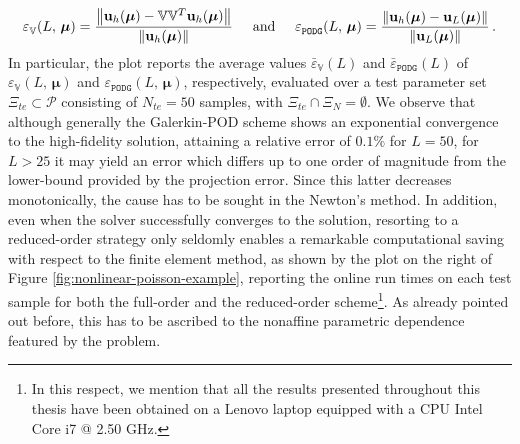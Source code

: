 \documentclass[12pt, a4paper, twoside, openright]{report}
\numberwithin{equation}{chapter}
\theoremstyle{theorem}
\theoremstyle{definition}
\theoremstyle{remark}
\theoremstyle{proposition}
\numberwithin{figure}{chapter}
\newcommand{\norm}[1]{\left\lVert#1\right\rVert}
\newcommand{\bg}[1]{\boldsymbol{#1}}
\begin{document}
		\begin{equation*}
			\varepsilon_{\mathbb{V}}^{}(L, \, \bg{\mu}) = \dfrac{\norm{\mathbf{u}_h(\bg{\mu}) - \mathbb{V} \mathbb{V}^T \mathbf{u}_h(\bg{\mu})}}{\norm{\mathbf{u}_h(\bg{\mu})}} \hspace*{0.5cm} \text{and} \hspace*{0.5cm} \varepsilon_{\texttt{PODG}}^{}(L, \, \bg{\mu}) = \dfrac{\norm{\mathbf{u}_h(\bg{\mu}) - \mathbf{u}_L(\bg{\mu})}}{\norm{\mathbf{u}_L(\bg{\mu})}} \, .
		\end{equation*}
		In particular, the plot reports the average values $\bar{\varepsilon}_{\mathbb{V}}^{}(L)$ and $\bar{\varepsilon}_{\texttt{PODG}}^{}(L)$ of $\varepsilon_{\mathbb{V}}(L, \, \bg{\mu})$ and $\varepsilon_{\texttt{PODG}}(L, \, \bg{\mu})$, respectively, evaluated over a test parameter set $\Xi_{te} \subset \mathcal{P}$ consisting of $N_{te} = 50$ samples, with $\Xi_{te} \cap \Xi_N = \emptyset$. We observe that although generally the Galerkin-POD scheme shows an exponential convergence to the high-fidelity solution, attaining a relative error of $0.1 \%$ for $L = 50$, for $L > 25$ it may yield an error which differs up to one order of magnitude from the lower-bound provided by the projection error. Since this latter decreases monotonically, the cause has to be sought in the Newton's method. In addition, even when the solver successfully converges to the solution, resorting to a reduced-order strategy only seldomly enables a remarkable computational saving with respect to the finite element method, as shown by the plot on the right of Figure \ref{fig:nonlinear-poisson-example}, reporting the online run times on each test sample for both the full-order and the reduced-order scheme\footnote{In this respect, we mention that all the results presented throughout this thesis have been obtained on a Lenovo laptop equipped with a CPU Intel Core i7 @ 2.50 GHz.}. As already pointed out before, this has to be ascribed to the nonaffine parametric dependence featured by the problem. 
		
\end{document}
